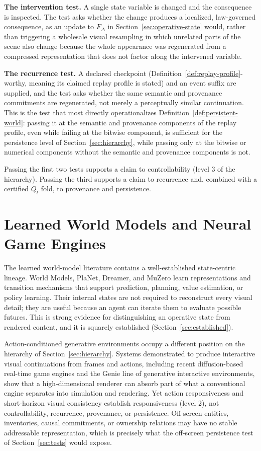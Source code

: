 \documentclass[11pt]{article}
\begin{document}
\textbf{The intervention test.} A single state variable is changed and the consequence is inspected. The test asks whether the change produces a localized, law-governed consequence, as an update to $F_\Delta$ in Section~\ref{sec:operative-state} would, rather than triggering a wholesale visual resampling in which unrelated parts of the scene also change because the whole appearance was regenerated from a compressed representation that does not factor along the intervened variable.

\textbf{The recurrence test.} A declared checkpoint (Definition~\ref{def:replay-profile}-worthy, meaning its claimed replay profile is stated) and an event suffix are supplied, and the test asks whether the same semantic and provenance commitments are regenerated, not merely a perceptually similar continuation. This is the test that most directly operationalizes Definition~\ref{def:persistent-world}: passing it at the semantic and provenance components of the replay profile, even while failing at the bitwise component, is sufficient for the persistence level of Section~\ref{sec:hierarchy}, while passing only at the bitwise or numerical components without the semantic and provenance components is not.

Passing the first two tests supports a claim to controllability (level 3 of the hierarchy). Passing the third supports a claim to recurrence and, combined with a certified $Q_t$ fold, to provenance and persistence.

\section{Learned World Models and Neural Game Engines}
\label{sec:learned-models}

The learned world-model literature contains a well-established state-centric lineage. World Models, PlaNet, Dreamer, and MuZero learn representations and transition mechanisms that support prediction, planning, value estimation, or policy learning. Their internal states are not required to reconstruct every visual detail; they are useful because an agent can iterate them to evaluate possible futures. This is strong evidence for distinguishing an operative state from rendered content, and it is squarely established (Section~\ref{sec:established}).

Action-conditioned generative environments occupy a different position on the hierarchy of Section~\ref{sec:hierarchy}. Systems demonstrated to produce interactive visual continuations from frames and actions, including recent diffusion-based real-time game engines and the Genie line of generative interactive environments, show that a high-dimensional renderer can absorb part of what a conventional engine separates into simulation and rendering. Yet action responsiveness and short-horizon visual consistency establish responsiveness (level 2), not controllability, recurrence, provenance, or persistence. Off-screen entities, inventories, causal commitments, or ownership relations may have no stable addressable representation, which is precisely what the off-screen persistence test of Section~\ref{sec:tests} would expose.
\end{document}

